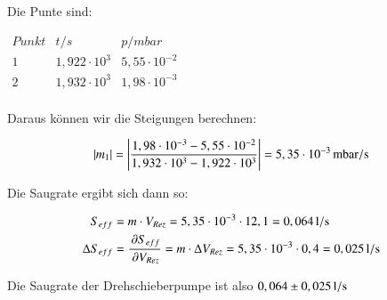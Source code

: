 Die Punte sind:

\begin{center}
	$
	\begin{matrix}
	Punkt	& t/s & p/mbar \\ 
	1	& 1,922 \cdot 10^{3} & 5,55 \cdot 10^{-2} \\ 
	2	& 1,932 \cdot 10^{3} & 1,98 \cdot 10^{-3} \\ 
	
	\end{matrix} 
	$	
\end{center}


Daraus können wir die Steigungen berechnen:

\begin{align*}
|m_1| &= \left| \frac{1,98 \cdot 10^{-3} - 5,55 \cdot 10^{-2}}{1,932 \cdot 10^{3} - 1,922 \cdot 10^{3}} \right| = \unit[5,35 \cdot 10^{-3}]{mbar/s} \\
\end{align*}

Die Saugrate ergibt sich dann so:

\begin{align*}
S_{eff} &= m \cdot V_{Rez} = 5,35 \cdot 10^{-3} \cdot 12,1 = \unit[0,064]{l/s} \\
\Delta S_{eff} &= \frac{\p S_{eff}}{\p V_{Rez}} = m \cdot \Delta V_{Rez} = 5,35 \cdot 10^{-3} \cdot 0,4 = \unit[0,025]{l/s}
\end{align*}


Die Saugrate der Drehschieberpumpe ist also $\unit[0,064 \pm 0,025]{l/s}$














